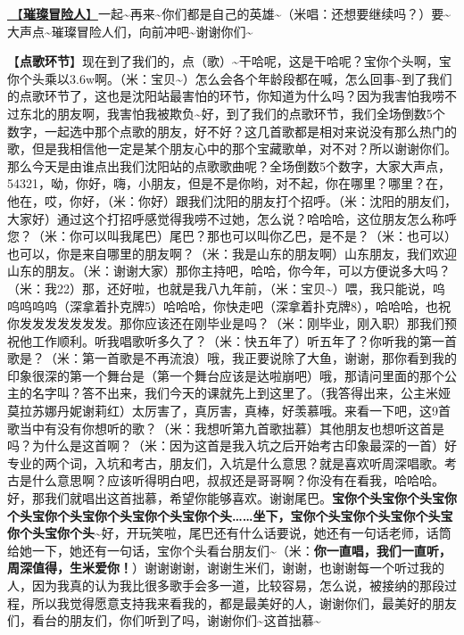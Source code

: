 \documentclass[]{ctexbook}
\begin{document}
\hyperref[adventurers]{🎵【\textbf{璀璨冒险人}】}一起\textasciitilde 再来\textasciitilde 你们都是自己的英雄\textasciitilde（米唱：还想要继续吗？）要\textasciitilde 大声点\textasciitilde 璀璨冒险人们，向前冲吧\textasciitilde 谢谢你们\textasciitilde{}

【\textbf{点歌环节}】现在到了我们的，点（歌）\textasciitilde 干哈呢，这是干哈呢？宝你个头啊，宝你个头乘以3.6w啊。（米：宝贝\textasciitilde）怎么会各个年龄段都在喊，怎么回事\textasciitilde 到了我们的点歌环节了，这也是沈阳站最害怕的环节，你知道为什么吗？因为我害怕我唠不过东北的朋友啊，我害怕我被欺负\textasciitilde 好，到了我们的点歌环节，我们全场倒数5个数字，一起选中那个点歌的朋友，好不好？这几首歌都是相对来说没有那么热门的歌，但是我相信他一定是某个朋友心中的那个宝藏歌单，对不对？所以谢谢你们。那么今天是由谁点出我们沈阳站的点歌歌曲呢？全场倒数5个数字，大家大声点，54321，呦，你好，嗨，小朋友，但是不是你哟，对不起，你在哪里？哪里？在，他在，哎，你好，（米：你好）跟我们沈阳的朋友打个招呼。（米：沈阳的朋友们，大家好）通过这个打招呼感觉得我唠不过她，怎么说？哈哈哈，这位朋友怎么称呼您？（米：你可以叫我尾巴）尾巴？那也可以叫你乙巴，是不是？（米：也可以）也可以，你是来自哪里的朋友啊？（米：我是山东的朋友啊）山东朋友，我们欢迎山东的朋友。（米：谢谢大家）那你主持吧，哈哈，你今年，可以方便说多大吗？（米：我22）那，还好啦，也就是我八九年前，（米：宝贝\textasciitilde）喂，我只能说，呜呜呜呜呜（深拿着扑克牌5）哈哈哈，你快走吧（深拿着扑克牌8），哈哈哈，也祝你发发发发发发发。那你应该还在刚毕业是吗？（米：刚毕业，刚入职）那我们预祝他工作顺利。听我唱歌听多久了？（米：快五年了）听五年了？你听我的第一首歌是？（米：第一首歌是不再流浪）哦，我正要说除了大鱼，谢谢，那你看到我的印象很深的第一个舞台是（第一个舞台应该是达啦崩吧）哦，那请问里面的那个公主的名字叫？答不出来，我们今天的课就先上到这里了。（我答得出来，公主米娅莫拉苏娜丹妮谢莉红）太厉害了，真厉害，真棒，好羡慕哦。来看一下吧，这9首歌当中有没有你想听的歌？（米：我想听第九首歌拙慕）其他朋友也想听这首是吗？为什么是这首啊？（米：因为这首是我入坑之后开始考古印象最深的一首）好专业的两个词，入坑和考古，朋友们，入坑是什么意思？就是喜欢听周深唱歌。考古是什么意思啊？应该听得明白吧，叔叔还是哥哥啊？你没有在看我，哈哈哈。好，那我们就唱出这首拙慕，希望你能够喜欢。谢谢尾巴。\textbf{宝你个头宝你个头宝你个头宝你个头宝你个头宝你个头宝你个头\ldots\ldots 坐下，宝你个头宝你个头宝你个头宝你个头宝你个头\textasciitilde{}}好，开玩笑啦，尾巴还有什么话要说，她还有一句话老师，话筒给她一下，她还有一句话，宝你个头看台朋友们\textasciitilde（米：\textbf{你一直唱，我们一直听，周深值得，生米爱你！}）谢谢谢谢，谢谢生米们，谢谢，也谢谢每一个听过我的人，因为我真的认为我比很多歌手会多一道，比较容易，怎么说，被接纳的那段过程，所以我觉得愿意支持我来看我的，都是最美好的人，谢谢你们，最美好的朋友们，看台的朋友们，你们听到了吗，谢谢你们\textasciitilde 这首拙慕\textasciitilde{}
\end{document}
